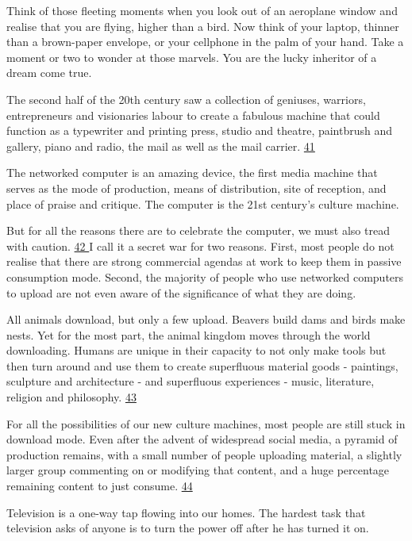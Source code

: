 Think of those fleeting moments when you look out of an aeroplane window and realise that you are flying, higher than a bird. Now think of your laptop, thinner than a brown-paper envelope, or your cellphone in the palm of your hand. Take a moment or two to wonder at those marvels. You are the lucky inheritor of a dream come true.

The second half of the 20th century saw a collection of geniuses, warriors, entrepreneurs and visionaries labour to create a fabulous machine that could function as a typewriter and printing press, studio and theatre, paintbrush and gallery, piano and radio, the mail as well as the mail carrier. \ul{41 \quad\quad\quad\quad\quad\quad\quad\quad\quad\quad\quad\quad}

The networked computer is an amazing device, the first media machine that serves as the mode of production, means of distribution, site of reception, and place of praise and critique. The computer is the 21st century's culture machine.

But for all the reasons there are to celebrate the computer, we must also tread with caution. \ul{42 \quad\quad\quad} I call it a secret war for two reasons. First, most people do not realise that there are strong commercial agendas at work to keep them in passive consumption mode. Second, the majority of people who use networked computers to upload are not even aware of the significance of what they are doing.

All animals download, but only a few upload. Beavers build dams and birds make nests. Yet for the most part, the animal kingdom moves through the world downloading. Humans are unique in their capacity to not only make tools but then turn around and use them to create superfluous material goods - paintings, sculpture and architecture - and superfluous experiences - music, literature, religion and philosophy. \ul{43 \quad\quad\quad\quad\quad\quad\quad\quad\quad\quad\quad\quad}

For all the possibilities of our new culture machines, most people are still stuck in download mode. Even after the advent of widespread social media, a pyramid of production remains, with a small number of people uploading material, a slightly larger group commenting on or modifying that content, and a huge percentage remaining content to just consume. \ul{44 \quad\quad\quad\quad\quad\quad\quad\quad\quad\quad\quad\quad}

Television is a one-way tap flowing into our homes. The hardest task that television asks of anyone is to turn the power off after he has turned it on.

